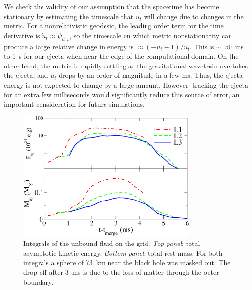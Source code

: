 We check the validity of our assumption that the spacetime has become
stationary by estimating the timescale that $u_t$ will change due to changes
in the metric.  For a nonrelativistic geodesic, the leading order term for
the time derivative is $\dot{u}_t\approx \psi_{tt,t}$, so the timescale on which
metric nonstationarity can produce a large relative change in energy is
$\approx (-u_t-1)/\dot{u}_t$.  This is $\sim$~50~ms to 1~s for our ejecta
when near the edge of the computational domain.  On the other hand, the
metric is rapidly settling as the gravitational wavetrain overtakes the
ejecta, and $\dot{u}_t$ drops by an order of magnitude in a few ms.  Thus,
the ejecta energy is not expected to change by a large amount.  However,
tracking the ejecta for an extra few milliseconds would significantly
reduce this source of error, an important consideration for future
simulations.

\begin{figure}
\centering
\includegraphics[width=9cm]{Figures/unbound_mass_and_energy_over_time}
\caption[Unbound matter mass and kinetic energy]{
Integrals of the unbound fluid on the grid.
{\em Top panel}: total asymptotic kinetic energy.
{\em Bottom panel}: total rest mass.
For both integrals a sphere of 73~km near the black hole was masked out.
The drop-off after 3~ms is due to the loss of matter through
the outer boundary.
}
\label{fig:ejecta_mass_and_energy}
\end{figure}


